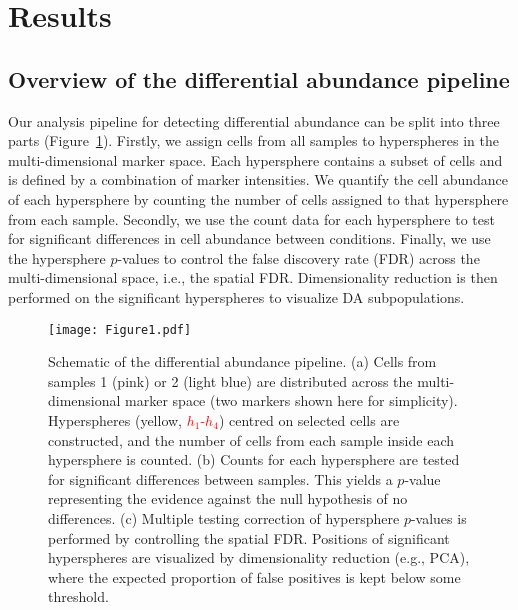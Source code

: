 \documentclass{article}
\newcommand\revised[1]{\textcolor{red}{#1}}
\begin{document}
\section{Results}
\subsection{Overview of the differential abundance pipeline}
Our analysis pipeline for detecting differential abundance can be split into three parts (Figure~\ref{fig:overview}). 
Firstly, we assign cells from all samples to hyperspheres in the multi-dimensional marker space.
Each hypersphere contains a subset of cells and is defined by a combination of marker intensities.
We quantify the cell abundance of each hypersphere by counting the number of cells assigned to that hypersphere from each sample.
Secondly, we use the count data for each hypersphere to test for significant differences in cell abundance between conditions.
Finally, we use the hypersphere $p$-values to control the false discovery rate (FDR) across the multi-dimensional space, i.e., the spatial FDR.
Dimensionality reduction is then performed on the significant hyperspheres to visualize DA subpopulations.

\begin{figure}[bt]
\begin{center}
    \texttt{[image: Figure1.pdf]}
\end{center}
\caption{Schematic of the differential abundance pipeline.
    (a) Cells from samples 1 (pink) or 2 (light blue) are distributed across the multi-dimensional marker space (two markers shown here for simplicity).
    Hyperspheres (yellow, \revised{$h_1$-$h_4$}) centred on selected cells are constructed, and the number of cells from each sample inside each hypersphere is counted.
    (b) Counts for each hypersphere are tested for significant differences between samples.
    This yields a $p$-value representing the evidence against the null hypothesis of no differences.
    (c) Multiple testing correction of hypersphere $p$-values is performed by controlling the spatial FDR.
    Positions of significant hyperspheres are visualized by dimensionality reduction (e.g., PCA), where the expected proportion of false positives is kept below some threshold.
}
\label{fig:overview}
\end{figure}
\end{document}

